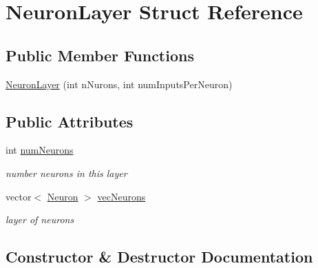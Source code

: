 \hypertarget{struct_neuron_layer}{}\section{Neuron\+Layer Struct Reference}
\label{struct_neuron_layer}
\subsection*{Public Member Functions}
\begin{DoxyCompactItemize}
\item 
\hyperlink{struct_neuron_layer_abd4e017ef1311a09eb0b840e5ebb9c7f}{Neuron\+Layer} (int n\+Nurons, int num\+Inputs\+Per\+Neuron)
\end{DoxyCompactItemize}
\subsection*{Public Attributes}
\begin{DoxyCompactItemize}
\item 
\hypertarget{struct_neuron_layer_a0c1340701dbd67d945f65f68e4e93f9e}{}\label{struct_neuron_layer_a0c1340701dbd67d945f65f68e4e93f9e} 
int \hyperlink{struct_neuron_layer_a0c1340701dbd67d945f65f68e4e93f9e}{num\+Neurons}
\begin{DoxyCompactList}\small\item\em number neurons in this layer \end{DoxyCompactList}\item 
\hypertarget{struct_neuron_layer_aa1dd1b1359dc7ae424f336357db233cd}{}\label{struct_neuron_layer_aa1dd1b1359dc7ae424f336357db233cd} 
vector$<$ \hyperlink{struct_neuron}{Neuron} $>$ \hyperlink{struct_neuron_layer_aa1dd1b1359dc7ae424f336357db233cd}{vec\+Neurons}
\begin{DoxyCompactList}\small\item\em layer of neurons \end{DoxyCompactList}\end{DoxyCompactItemize}


\subsection{Constructor \& Destructor Documentation}
\hypertarget{struct_neuron_layer_abd4e017ef1311a09eb0b840e5ebb9c7f}{}\label{struct_neuron_layer_abd4e017ef1311a09eb0b840e5ebb9c7f} 
